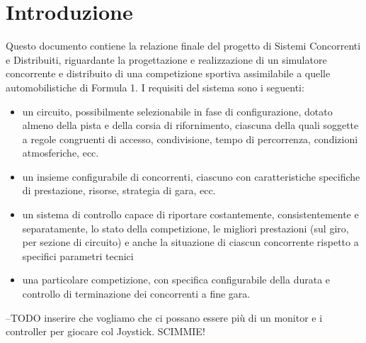 \chapter{Introduzione} %

\label{Chapter1} %


Questo documento contiene la relazione finale del progetto di Sistemi Concorrenti e Distribuiti, riguardante la progettazione e realizzazione di un simulatore concorrente e distribuito di una competizione sportiva assimilabile a quelle automobilistiche di Formula 1.
I requisiti del sistema sono i seguenti:
\begin{itemize}
 \item un circuito, possibilmente selezionabile in fase di configurazione, dotato almeno della pista e della corsia di rifornimento, ciascuna della quali soggette a regole congruenti di accesso, condivisione, tempo di percorrenza, condizioni atmosferiche, ecc.
 \item un insieme configurabile di concorrenti, ciascuno con caratteristiche specifiche di prestazione, risorse, strategia di gara, ecc.
 \item un sistema di controllo capace di riportare costantemente, consistentemente e separatamente, lo stato della competizione, le migliori prestazioni (sul giro, per sezione di circuito) e anche la situazione di ciascun concorrente rispetto a specifici parametri tecnici
 \item una particolare competizione, con specifica configurabile della durata e controllo di terminazione dei concorrenti a fine gara.
\end{itemize}
--TODO inserire che vogliamo che ci possano essere più di un monitor e i controller per giocare col Joystick. SCIMMIE!
